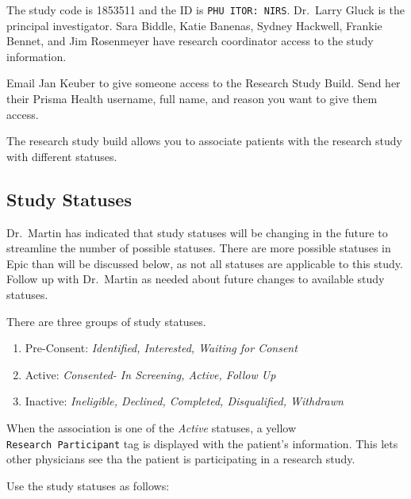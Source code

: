 \documentclass[
]{book}
\providecommand{\tightlist}{%
  \setlength{\itemsep}{0pt}\setlength{\parskip}{0pt}}
\begin{document}
The study code is 1853511 and the ID is \texttt{PHU\ ITOR:\ NIRS}. Dr.~Larry Gluck is the principal investigator. Sara Biddle, Katie Banenas, Sydney Hackwell, Frankie Bennet, and Jim Rosenmeyer have research coordinator access to the study information.

Email Jan Keuber to give someone access to the Research Study Build. Send her their Prisma Health username, full name, and reason you want to give them access.

The research study build allows you to associate patients with the research study with different statuses.

\hypertarget{EPIC-StudyStatuses}{%
\subsection{Study Statuses}\label{EPIC-StudyStatuses}}

Dr.~Martin has indicated that study statuses will be changing in the future to streamline the number of possible statuses. There are more possible statuses in Epic than will be discussed below, as not all statuses are applicable to this study. Follow up with Dr.~Martin as needed about future changes to available study statuses.

There are three groups of study statuses.

\begin{enumerate}
\def\labelenumi{\arabic{enumi}.}
\tightlist
\item
  Pre-Consent:
  \emph{Identified, Interested, Waiting for Consent}
\item
  Active:
  \emph{Consented- In Screening, Active, Follow Up}
\item
  Inactive:
  \emph{Ineligible, Declined, Completed, Disqualified, Withdrawn}
\end{enumerate}

When the association is one of the \emph{Active} statuses, a yellow \texttt{Research\ Participant} tag is displayed with the patient's information. This lets other physicians see tha the patient is participating in a research study.

Use the study statuses as follows:
\end{document}
